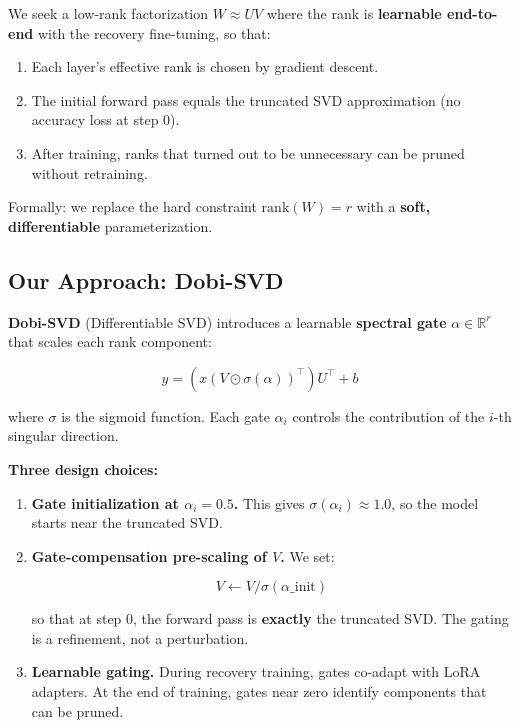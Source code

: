 We seek a low-rank factorization $W \approx U V$ where the rank is 
\textbf{learnable end-to-end} with the recovery fine-tuning, so that:

\begin{enumerate}
\item Each layer's effective rank is chosen by gradient descent.
\item The initial forward pass equals the truncated SVD approximation
  (no accuracy loss at step 0).
\item After training, ranks that turned out to be unnecessary can be pruned
  without retraining.

\end{enumerate}
Formally: we replace the hard constraint $\text{rank}(W) = r$ with a 
\textbf{soft, differentiable} parameterization.

\subsection{Our Approach: Dobi-SVD}

\textbf{Dobi-SVD} (Differentiable SVD) introduces a learnable \textbf{spectral gate} 
$\alpha \in \mathbb{R}^r$ that scales each rank component:

\[
y = (x (V \odot \sigma(\alpha))^\top) U^\top + b
\tag{1.2}
\]

where $\sigma$ is the sigmoid function. Each gate $\alpha_i$ controls the 
contribution of the $i$-th singular direction.

\textbf{Three design choices:}

\begin{enumerate}
\item \textbf{Gate initialization at $\alpha_i = 0.5$.} This gives
  $\sigma(\alpha_i) \approx 1.0$, so the model starts near
  the truncated SVD.

\item \textbf{Gate-compensation pre-scaling of $V$.} We set:

  $$
  V \leftarrow V / \sigma(\alpha\_\text{init})
  \tag{1.3}
  $$

  so that at step 0, the forward pass is \textbf{exactly} the truncated SVD.
  The gating is a refinement, not a perturbation.

\item \textbf{Learnable gating.} During recovery training, gates co-adapt with LoRA
  adapters. At the end of training, gates near zero identify components
  that can be pruned.

\end{enumerate}
